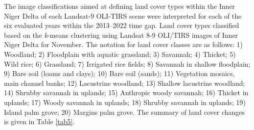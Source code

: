 \documentclass[12pt,a4paper,oneside]{article}
\def \newpar{\vspace{6pt}}
\begin{document}
\newpar The image classifications aimed at defining land cover types within the Inner Niger Delta of each Landsat-9 OLI-TIRS scene were interpreted for each of the six evaluated years within the 2013--2022 time gap. Land cover types classified based on the \emph{k}-means clustering using Landsat 8-9 OLI/TIRS images of Inner Niger Delta for November. The notation for land cover classes are as follows: 1) Woodland; 2) Floodplain with aquatic grassland; 3) Savannah; 4) Thicket; 5) Wild rice; 6) Grassland; 7) Irrigated rice fields; 8) Savannah in shallow floodplain; 9) Bare soil (loams and clays); 10) Bare soil (sands); 11) Vegetation mosaics, main channel banks; 12) Lacustrine woodland; 13) Shallow lacustrine woodland; 14) Shrubby savannah in uplands; 15) Anthropic woody savannah; 16) Thicket in uplands; 17) Woody savannah in uplands; 18) Shrubby savannah in uplands; 19) Island palm grove; 20) Margins palm grove. The summary of land cover changes is given in Table \ref{tab5}.
\end{document}
